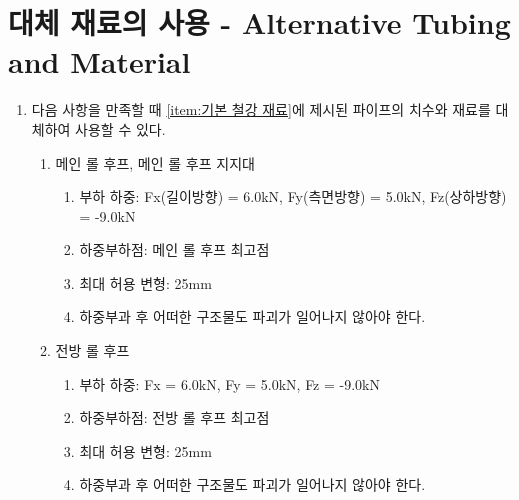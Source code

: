 \documentclass[final,a4paper,10pt]{report}
\begin{document}
\section{대체 재료의 사용 - Alternative Tubing and Material}\label{rule:formula-technical.alternative-materials}
\begin{enumerate}
  \item\label{rule:formula-technical.alternative-materials.load-cases} 다음 사항을 만족할 때 \ref{item:기본 철강 재료}에 제시된 파이프의 치수와 재료를 대체하여 사용할 수 있다. \label{item:대체 재료 조건}
    \begin{enumerate}
      \item\label{rule:formula-technical.alternative-materials.load-cases.main-roll-hoop} 메인 롤 후프, 메인 롤 후프 지지대
        \begin{enumerate}
          \item\label{rule:formula-technical.alternative-materials.load-cases.main-roll-hoop.applied-load} 부하 하중: Fx(길이방향) = 6.0kN, Fy(측면방향) = 5.0kN, Fz(상하방향) = -9.0kN
          \item\label{rule:formula-technical.alternative-materials.load-cases.main-roll-hoop.load-point} 하중부하점: 메인 롤 후프 최고점
          \item\label{rule:formula-technical.alternative-materials.load-cases.main-roll-hoop.max-deformation-25mm} 최대 허용 변형: 25mm
          \item\label{rule:formula-technical.alternative-materials.load-cases.main-roll-hoop.no-structural-failure} 하중부과 후 어떠한 구조물도 파괴가 일어나지 않아야 한다.
        \end{enumerate}
      \item\label{rule:formula-technical.alternative-materials.load-cases.front-roll-hoop} 전방 롤 후프
        \begin{enumerate}
          \item\label{rule:formula-technical.alternative-materials.load-cases.front-roll-hoop.applied-load} 부하 하중: Fx = 6.0kN, Fy = 5.0kN, Fz = -9.0kN
          \item\label{rule:formula-technical.alternative-materials.load-cases.front-roll-hoop.load-point} 하중부하점: 전방 롤 후프 최고점
          \item\label{rule:formula-technical.alternative-materials.load-cases.front-roll-hoop.max-deformation-25mm} 최대 허용 변형: 25mm
          \item\label{rule:formula-technical.alternative-materials.load-cases.front-roll-hoop.no-structural-failure} 하중부과 후 어떠한 구조물도 파괴가 일어나지 않아야 한다.

\end{enumerate}
\end{enumerate}
\end{enumerate}
\end{document}
